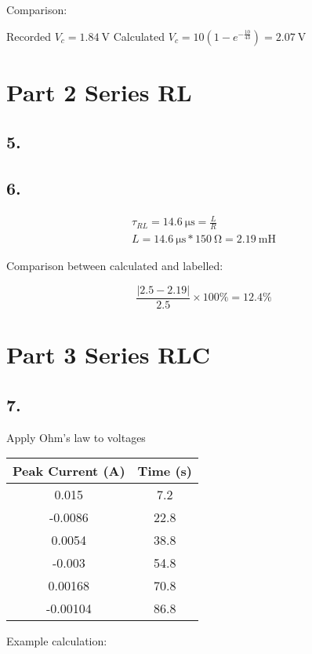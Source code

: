 \documentclass[12pt,letterpaper]{article}
\begin{document}
Comparison:

Recorded $V_c = \SI{1.84}{\volt}$
Calculated $V_c = 10(1-e^{-\frac{10}{43}}) = \SI{2.07}{\volt}$
\section*{Part 2 Series RL}
\subsection*{5.}

\subsection*{6.}
\begin{gather*}
\tau_{RL} = \SI{14.6}{\micro\second} = \frac{L}{R}\\
L = \SI{14.6}{\micro\second} * \SI{150}{\ohm} = \SI{2.19}{\milli\henry}
\end{gather*}

Comparison between calculated and labelled:

$$\frac{|2.5-2.19|}{2.5} \times 100 \% = 12.4\%$$
\section*{Part 3 Series RLC}
\subsection*{7.}
Apply Ohm's law to voltages
\begin{center}
    \begin{tabular}{|c|c|}
        \hline
        {Peak Current (\si{\ampere})} & {Time (\si{\second})} \\ \hline
        0.015&7.2\\  \hline
        -0.0086&22.8\\\hline
        0.0054&38.8\\\hline
        -0.003&54.8\\\hline
        0.00168&70.8\\\hline
        -0.00104&86.8\\\hline
    \end{tabular}
\end{center}
Example calculation:
\end{document}
